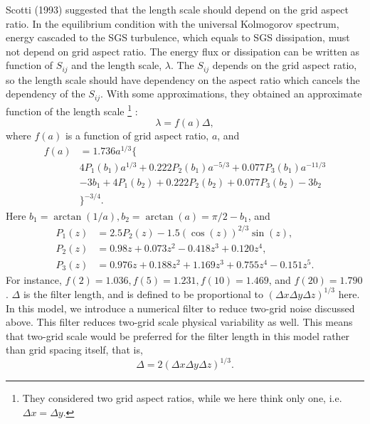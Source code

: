 Scotti (1993) suggested that the length scale should depend on the grid aspect ratio.
In the equilibrium condition with the universal Kolmogorov spectrum, energy cascaded to the SGS turbulence, which equals to SGS dissipation, must not depend on grid aspect ratio.
The energy flux or dissipation can be written as function of $S_{ij}$ and the length scale, $\lambda$.
The $S_{ij}$ depends on the grid aspect ratio, so the length scale should have dependency on the aspect ratio which cancels the dependency of the $S_{ij}$.
With some approximations, they obtained an approximate function of the length scale
\footnote{They considered two grid aspect ratios, while we here think only one, i.e. $\Delta x = \Delta y$.}
:
\begin{equation}
\lambda = f(a) \Delta,
\end{equation}
where $f(a)$ is a function of grid aspect ratio, $a$, and
\begin{align}
  f(a) &= 1.736 a^{1/3} \{ \nonumber\\
  & 4P_1(b_1)a^{1/3} + 0.222P_2(b_1)a^{-5/3} + 0.077P_3(b_1)a^{-11/3} \nonumber\\
  & - 3b_1 + 4P_1(b_2) + 0.222P_2(b_2) + 0.077P_3(b_2)- 3b_2 \nonumber\\
  & \}^{-3/4}. \label{eq: f}
\end{align}
Here $b_1 = \arctan(1/a), b_2 = \arctan(a) = \pi/2 - b_1$, and
\begin{align}
  P_1(z) &= 2.5P_2(z) - 1.5 (\cos(z))^{2/3} \sin(z), \\
  P_2(z) &= 0.98z + 0.073z^2 -0.418z^3 + 0.120z^4, \\
  P_3(z) &= 0.976z + 0.188z^2 + 1.169z^3 + 0.755z^4 - 0.151z^5.
\end{align}
For instance, $f(2) = 1.036, f(5) = 1.231, f(10) = 1.469$, and $f(20) = 1.790$.
$\Delta$ is the filter length, and is defined to be proportional to $(\Delta x \Delta y \Delta z)^{1/3}$ here.
In this model, we introduce a numerical filter to reduce two-grid noise discussed above.
This filter reduces two-grid scale physical variability as well.
This means that two-grid scale would be preferred for the filter length in this model rather than grid spacing itself, that is,
\begin{equation}
  \Delta = 2 (\Delta x \Delta y \Delta z)^{1/3}. \label{eq: delta}
\end{equation}



